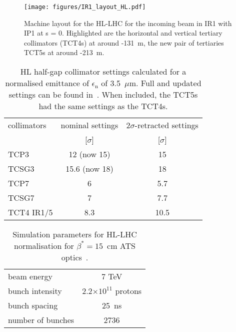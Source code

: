 \begin{figure}%
\begin{center}
\texttt{[image: figures/IR1\_layout\_HL.pdf]}
\end{center}
\vspace{-0.6cm}
 \caption{Machine layout for the HL-LHC for the incoming beam in IR1 with IP1 at s = 0. Highlighted are the horizontal and vertical tertiary collimators (TCT4s) at around -131~m, the new pair of tertiaries TCT5s at around -213~m.
  \label{hllhc_layout}}
\end{figure}


 \begin{table}%
   \centering
   \caption{HL half-gap collimator settings calculated for a normalised emittance of $\epsilon_{\mathrm{n}}$ of 3.5~$\mu$m. Full and updated settings can be found in~\cite{collSettRef}. When included, the TCT5s had the same settings as the TCT4s.}

   \begin{tabular}{l|c|c}
       \hline
       collimators &        nominal settings & $2\sigma$-retracted settings\\
                   &         [$\sigma$] &  [$\sigma$]\\
       \hline
       TCP3 & 12 (now 15) & 15 \\
       TCSG3 & 15.6 (now 18)& 18 \\
       TCP7 & 6 & 5.7 \\
       TCSG7 & 7 & 7.7 \\
       TCT4 IR1/5 & 8.3 & 10.5 \\
       \hline
   \end{tabular}
   \label{HLcollSettings}
\end{table}

\begin{table}%
   \centering
   \caption{Simulation parameters for HL-LHC normalisation for $\beta^* = 15$~cm ATS optics~\cite{ATSref}.}
   \begin{tabular}{l|c}
       \hline
       beam energy & 7 TeV \\
       bunch intensity & 2.2$\times 10^{11}$ protons\\
       bunch spacing & 25~ns \\
       number of bunches & 2736 \\
       \hline
   \end{tabular}
   \label{hlscenario}
\end{table}
